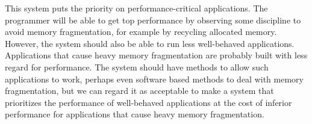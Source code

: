 \documentclass[forwardcom.tex]{subfiles}
\begin{document}
This system puts the priority on performance-critical applications. The programmer will be able to get top performance by observing some discipline to avoid memory fragmentation, for example by recycling allocated memory. However, the system should also be able to run less well-behaved applications. Applications that cause heavy memory fragmentation are probably built with less regard for performance. The system should have methods to allow such applications to work, perhaps even software based methods to deal with memory fragmentation, but we can regard it as acceptable to make a system that prioritizes the performance of well-behaved applications at the cost of inferior performance for applications that cause heavy memory fragmentation.
\end{document}

